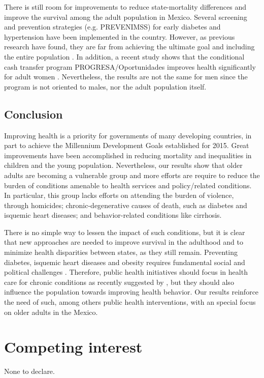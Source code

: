 \documentclass[11.5pt]{article}
\begin{document}
\begin{spacing}{1.5}
There is still room for improvements to reduce state-mortality differences and improve the survival among the adult population in Mexico. Several screening and prevention strategies (e.g. PREVENIMSS) for early diabetes and hypertension have been implemented in the country. However, as previous research have found, they are far from achieving the ultimate goal and including the entire population \citep{castro2010potential}. In addition, a recent study shows that the conditional cash transfer program PROGRESA/Oportunidades improves health significantly for adult women \citep{behrman2013health}. Nevertheless, the results are not the same for men since the program is not oriented to males, nor the adult population itself. 




\subsection*{Conclusion}
Improving health is a priority for governments of many developing countries, in part to achieve the Millennium Development Goals established for 2015.  Great improvements have been accomplished in reducing mortality and inequalities in children and the young population. Nevertheless, our results show that older adults are becoming a vulnerable group and more efforts are require to reduce the burden of conditions amenable to health services and policy/related conditions. In particular, this group lacks efforts on attending the burden of violence, through homicides; chronic-degenerative
causes of death, such as diabetes and isquemic heart diseases; and behavior-related conditions like cirrhosis.  

There is no simple way to lessen the impact of such conditions, but it is clear that new approaches are needed to improve survival in the adulthood and to minimize health disparities between states, as they still remain. Preventing diabetes, isquemic heart diseases and obesity requires fundamental social and political challenges \citep{hossain2007obesity}. Therefore,  public health initiatives should focus in health care for chronic conditions as recently suggested by \citet{knaul2015achieving}, but they should also influence the population towards improving health behavior. Our results reinforce the need of such, among others public health interventions, with an special focus on older adults in the Mexico. 


\end{spacing}

\section*{Competing interest}
None to declare.
\end{document}
